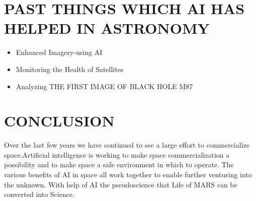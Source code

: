 \documentclass[a4paper]{article}
\begin{document}
\section{PAST THINGS WHICH AI HAS HELPED IN ASTRONOMY}
\begin{itemize}
    \item Enhanced Imagery-using AI
    \item Monitoring the Health of Satellites
    \item Analyzing THE FIRST IMAGE OF BLACK HOLE 
M87
\end{itemize}
\section{CONCLUSION}
Over the last few years we have continued to see a large effort to commercialize space.Artificial intelligence is working to make space commercialization a possibility and to make space a safe environment in which to operate. The various benefits of AI in space all work together to enable further venturing into the unknown. With help of AI the pseudoscience that Life of MARS can be converted into Science.\\

\newpage
\end{document}
